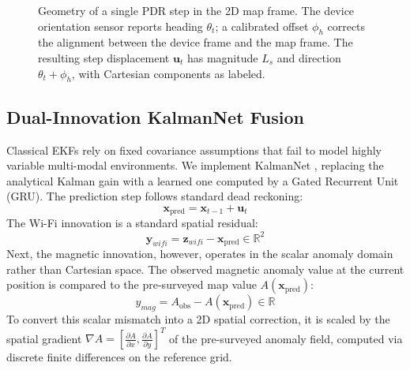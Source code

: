 \documentclass[conference]{IEEEtran}
\begin{document}
\begin{figure}[htbp]
{
}
\caption{Geometry of a single PDR step in the 2D map frame. The device orientation sensor reports heading $\theta_t$; a calibrated offset $\phi_h$ corrects the alignment between the device frame and the map frame. The resulting step displacement $\mathbf{u}_t$ has magnitude $L_s$ and direction $\theta_t + \phi_h$, with Cartesian components as labeled.}
\label{fig:pdr_geometry}
\end{figure}

\subsection{Dual-Innovation KalmanNet Fusion}\label{sec:kalmannet}


Classical EKFs rely on fixed covariance assumptions that fail to model highly variable multi-modal environments. We implement KalmanNet \cite{kalmannet}, replacing the analytical Kalman gain with a learned one computed by a Gated Recurrent Unit (GRU). The prediction step follows standard dead reckoning:
\begin{equation}
\mathbf{x}_{\text{pred}} = \mathbf{x}_{t-1} + \mathbf{u}_t \label{eq:kn_predict}
\end{equation}
The Wi-Fi innovation is a standard spatial residual:
\begin{equation}
\mathbf{y}_{wifi} = \mathbf{z}_{wifi} - \mathbf{x}_{\text{pred}} \in \mathbb{R}^2 \label{eq:kn_innovate_w}
\end{equation}
Next, the magnetic innovation, however, operates in the scalar anomaly domain rather than Cartesian space. The observed magnetic anomaly value at the current position is compared to the pre-surveyed map value $A(\mathbf{x}_{\text{pred}})$: 
\begin{equation}
y_{mag} = A_{\text{obs}} - A(\mathbf{x}_{\text{pred}}) \in \mathbb{R} \label{eq:kn_innovate_m}
\end{equation}
To convert this scalar mismatch into a 2D spatial correction, it is scaled by the spatial gradient $\nabla A = [\frac{\partial A}{\partial x}, \frac{\partial A}{\partial y}]^T$ of the pre-surveyed anomaly field, computed via discrete finite differences on the reference grid.
\end{document}
